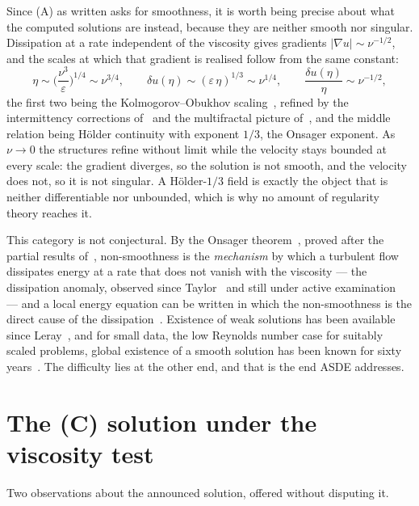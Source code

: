 \documentclass[11pt]{article}
\newcommand{\grad}{\nabla}
\newcommand{\eps}{\varepsilon}
\begin{document}
Since (A) as written asks for smoothness, it is worth being precise about what the computed
solutions are instead, because they are neither smooth nor singular. Dissipation at a rate
independent of the viscosity gives gradients $|\grad u|\sim\nu^{-1/2}$, and the scales at which
that gradient is realised follow from the same constant:
\begin{equation}\label{eq:delta}
\eta \sim \Big(\frac{\nu^3}{\eps}\Big)^{1/4} \sim \nu^{3/4},
\qquad
\delta u(\eta) \sim (\eps\,\eta)^{1/3} \sim \nu^{1/4},
\qquad
\frac{\delta u(\eta)}{\eta} \sim \nu^{-1/2},
\end{equation}
the first two being the Kolmogorov--Obukhov scaling~\cite{kolmogorov41,obukhov41}, refined by the
intermittency corrections of~\cite{kolmogorov62,obukhov62} and the multifractal picture
of~\cite{frischparisi}, and the middle relation being H\"older continuity with exponent $1/3$, the
Onsager exponent. As $\nu\to0$ the structures refine without limit while the velocity stays bounded
at every scale: the gradient diverges, so the solution is not smooth, and the velocity does not, so
it is not singular. A H\"older-$1/3$ field is exactly the object that is neither differentiable nor
unbounded, which is why no amount of regularity theory reaches it.

This category is not conjectural. By the Onsager theorem~\cite{onsager,isett}, proved after the
partial results of~\cite{eyink,cet,dls,bdlis}, non-smoothness is the \emph{mechanism} by which a
turbulent flow dissipates energy at a rate that does not vanish with the viscosity --- the
dissipation anomaly, observed since Taylor~\cite{taylor} and still under active
examination~\cite{iyer} --- and a local energy equation can be written in which the non-smoothness
is the direct cause of the dissipation~\cite{duchonrobert}. Existence of weak solutions has been
available since Leray~\cite{leray,lions}, and for small data, the low Reynolds number case for
suitably scaled problems, global existence of a smooth solution has been known for sixty
years~\cite{fujitakato,kato}. The difficulty lies at the other end, and that is the end ASDE
addresses.


\section{The (C) solution under the viscosity test}\label{sec:nu}

Two observations about the announced solution, offered without disputing it.
\end{document}
